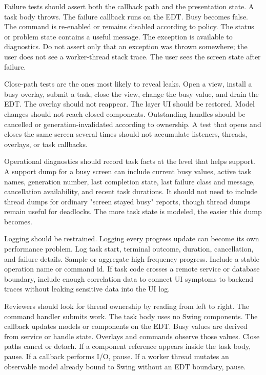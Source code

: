 Failure tests should assert both the callback path and the presentation state.
A task body throws. The failure callback runs on the EDT. Busy becomes false.
The command is re-enabled or remains disabled according to policy. The status
or problem state contains a useful message. The exception is available to
diagnostics. Do not assert only that an exception was thrown somewhere; the
user does not see a worker-thread stack trace. The user sees the screen state
after failure.

Close-path tests are the ones most likely to reveal leaks. Open a view, install
a busy overlay, submit a task, close the view, change the busy value, and drain
the EDT. The overlay should not reappear. The layer UI should be restored.
Model changes should not reach closed components. Outstanding handles should
be cancelled or generation-invalidated according to ownership. A test that
opens and closes the same screen several times should not accumulate listeners,
threads, overlays, or task callbacks.

Operational diagnostics should record task facts at the level that helps
support. A support dump for a busy screen can include current busy values,
active task names, generation number, last completion state, last failure class
and message, cancellation availability, and recent task durations. It should
not need to include thread dumps for ordinary "screen stayed busy" reports,
though thread dumps remain useful for deadlocks. The more task state is modeled,
the easier this dump becomes.

Logging should be restrained. Logging every progress update can become its own
performance problem. Log task start, terminal outcome, duration, cancellation,
and failure details. Sample or aggregate high-frequency progress. Include a
stable operation name or command id. If task code crosses a remote service or
database boundary, include enough correlation data to connect UI symptoms to
backend traces without leaking sensitive data into the UI log.

Reviewers should look for thread ownership by reading from left to right. The
command handler submits work. The task body uses no Swing components. The
callback updates models or components on the EDT. Busy values are derived from
service or handle state. Overlays and commands observe those values. Close
paths cancel or detach. If a component reference appears inside the task body,
pause. If a callback performs I/O, pause. If a worker thread mutates an
observable model already bound to Swing without an EDT boundary, pause.

